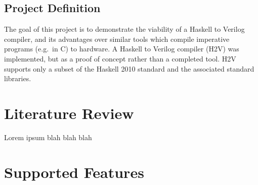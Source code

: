 \documentclass[english,onecolumn]{scrartcl}
\begin{document}
\subsection{Project Definition}
The goal of this project is to demonstrate the viability of a Haskell to Verilog compiler, and its advantages over similar tools
which compile imperative programs (e.g.\ in C) to hardware. A Haskell to Verilog compiler (H2V) was implemented, but as a proof of
concept rather than a completed tool. H2V supports only a subset of the Haskell 2010 standard and the associated standard
libraries.


\section{Literature Review}

Lorem ipsum blah blah blah


\section{Supported Features}
\end{document}
